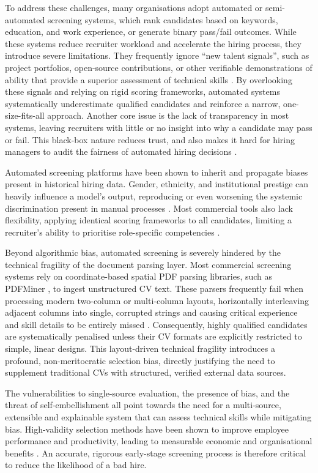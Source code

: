 To address these challenges, many organisations adopt automated or semi-automated screening systems, which rank candidates based
on keywords, education, and work experience, or generate binary pass/fail outcomes. While these systems reduce recruiter workload
and accelerate the hiring process, they introduce severe limitations. They frequently ignore ``new talent signals'', such as project
portfolios, open-source contributions, or other verifiable demonstrations of ability that provide a superior assessment of technical
skills \cite{chamorro2016}. By overlooking these signals and relying on rigid scoring frameworks, automated systems systematically
underestimate qualified candidates and reinforce a narrow, one-size-fits-all approach. Another core issue is the lack of transparency 
in most systems, leaving recruiters with little or no insight into why a candidate may pass or fail. This 
black-box nature reduces trust, and also makes it hard for hiring managers to audit the fairness of automated hiring 
decisions \cite{raghavan2020}.


Automated screening platforms have been shown to inherit and propagate biases present in historical hiring data. Gender,
ethnicity, and institutional prestige can heavily influence a model's output, reproducing or even worsening the systemic discrimination present
in manual processes \cite{raghavan2020, bogen2018}. Most commercial tools also lack flexibility, applying identical scoring
frameworks to all candidates, limiting a recruiter's ability to prioritise role-specific competencies \cite{chamorro2016}.

Beyond algorithmic bias, automated screening is severely hindered by the technical fragility of the document parsing layer.
Most commercial screening systems rely on coordinate-based spatial PDF parsing libraries, such as PDFMiner \cite{pdfminer}, to
ingest unstructured CV text. These parsers frequently fail when processing modern two-column or multi-column layouts, horizontally
interleaving adjacent columns into single, corrupted strings and causing critical experience and skill details to be entirely
missed \cite{emnlp2025resumebench}. Consequently, highly qualified candidates are systematically penalised unless their CV formats 
are explicitly restricted to simple, linear designs. This layout-driven technical fragility introduces a profound, non-meritocratic 
selection bias, directly justifying the need to supplement traditional CVs with structured, verified external data sources.


The vulnerabilities to single-source evaluation, the presence of bias, and the threat of self-embellishment all point towards
the need for a multi-source, extensible and explainable system that can assess technical skills while mitigating bias. High-validity 
selection methods have been shown to improve employee performance and productivity, leading to measurable economic and organisational 
benefits \cite{schmidt1998}. An accurate, rigorous early-stage screening process is therefore critical to reduce the likelihood of a bad hire.

